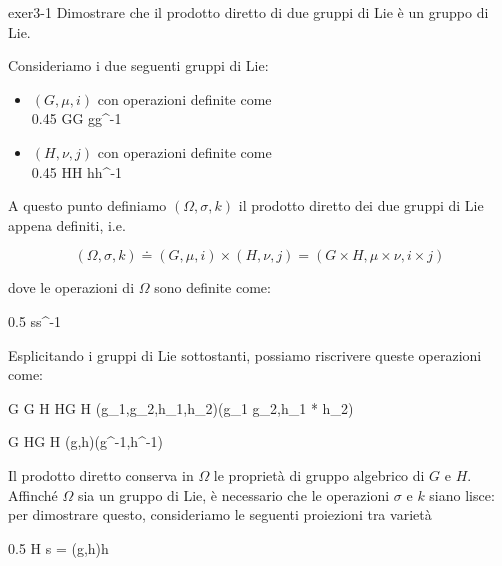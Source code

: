 {exer3-1}
{
Dimostrare che il prodotto diretto di due gruppi di Lie è un gruppo di Lie.
}
{
Consideriamo i due seguenti gruppi di Lie:

\begin{itemize}
	\item $ (G, \mu, i) $ con operazioni definite come \\
		{0.45}{%
					{G}{G}
					{g}{g^{-1}}
				}
	
	\item $ (H, \nu, j) $ con operazioni definite come \\
		{0.45}{%
					{H}{H}
					{h}{h^{-1}}
			}	
\end{itemize}

A questo punto definiamo $ (\Omega, \sigma, k) $ il prodotto diretto dei due gruppi di Lie appena definiti, i.e.

\begin{equation}
	(\Omega, \sigma, k) \doteq (G, \mu, i) \times (H, \nu, j) = (G \times H, \mu \times \nu, i \times j)
\end{equation}

dove le operazioni di $ \Omega $ sono definite come:

	{0.5}{%
				{\Omega}{\Omega}
				{s}{s^{-1}}
			}

Esplicitando i gruppi di Lie sottostanti, possiamo riscrivere queste operazioni come:

\map{\sigma = \mu \times \nu}
	{G \times G \times H \times H}{G \times H}
	{(g_{1},g_{2},h_{1},h_{2})}{(g_{1} \cdot g_{2},h_{1} * h_{2})}

	{G \times H}{G \times H}
	{(g,h)}{(g^{-1},h^{-1})}

Il prodotto diretto conserva in $ \Omega $ le proprietà di gruppo algebrico di $ G $ e $ H $. Affinché $ \Omega $ sia un gruppo di Lie, è necessario che le operazioni $ \sigma $ e $ k $ siano lisce: per dimostrare questo, consideriamo le seguenti proiezioni tra varietà

	{0.5}{%
				{\Omega}{H}
				{s = (g,h)}{h}
			}

}
